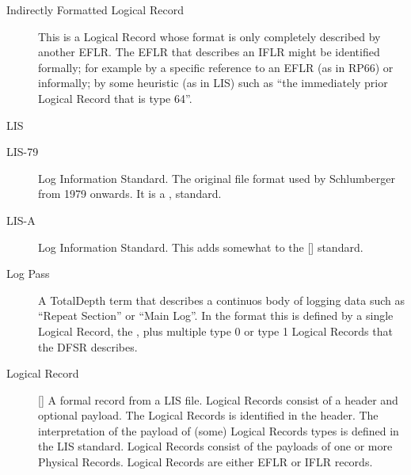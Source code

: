 \documentclass[letterpaper,10pt,english]{sphinxmanual}
\begin{document}
\begin{description}
\item[{Indirectly Formatted Logical Record}] \leavevmode{}\label{\detokenize{glossary:term-indirectly-formatted-logical-record}}
This is a Logical Record whose format is only completely described by another EFLR. The EFLR that describes an IFLR might be identified formally; for example by a specific reference to an EFLR (as in RP66) or informally; by some heuristic (as in LIS) such as “the immediately prior Logical Record that is type 64”.

\item[{LIS}] \leavevmode{}\label{\detokenize{glossary:term-lis}}\item[{LIS-79}] \leavevmode{}\label{\detokenize{glossary:term-lis-79}}
Log Information Standard. The original file format used by Schlumberger from 1979 onwards.
It is a ,  standard.

\item[{LIS-A}] \leavevmode{}\label{\detokenize{glossary:term-lis-a}}
 Log Information Standard. This adds somewhat to the {[}{\hyperref[\detokenize{glossary:term-lis-79}]{}}{]} standard.

\item[{Log Pass}] \leavevmode{}\label{\detokenize{glossary:term-log-pass}}
A TotalDepth term that describes a continuos body of logging data such as “Repeat Section” or “Main Log”.
In the {\hyperref[\detokenize{glossary:term-lis}]{}} format this is defined by a single Logical Record, the {\hyperref[\detokenize{glossary:term-dfsr}]{}}, plus multiple type 0 or type 1 Logical Records that the DFSR describes.

\item[{Logical Record}] \leavevmode{}\label{\detokenize{glossary:term-logical-record}}
{[}{\hyperref[\detokenize{glossary:term-lis}]{}}{]} A formal record from a LIS file. Logical Records consist of a header and optional payload. The Logical Records  is identified in the header. The interpretation of the payload of (some) Logical Records types is defined in the LIS standard. Logical Records consist of the payloads of one or more Physical Records. Logical Records are either EFLR or IFLR records.


\end{description}
\end{document}
